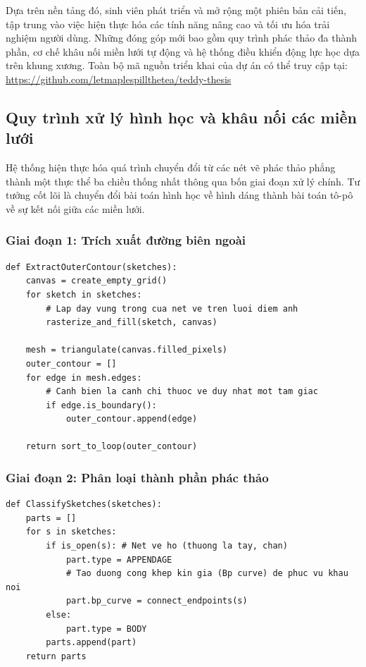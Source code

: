 \documentclass{report}
\newenvironment{graycode}
{\begin{mdframed}[backgroundcolor=light-gray, linecolor=light-gray, roundcorner=5pt]}
{\end{mdframed}}
\begin{document}
Dựa trên nền tảng đó, sinh viên phát triển và mở rộng một phiên bản cải tiến, tập trung vào việc hiện thực hóa các tính năng nâng cao và tối ưu hóa trải nghiệm người dùng. Những đóng góp mới bao gồm quy trình phác thảo đa thành phần, cơ chế khâu nối miền lưới tự động và hệ thống điều khiển động lực học dựa trên khung xương. Toàn bộ mã nguồn triển khai của dự án có thể truy cập tại: \url{https://github.com/letmaplespillthetea/teddy-thesis}

\subsection{Quy trình xử lý hình học và khâu nối các miền lưới}

Hệ thống hiện thực hóa quá trình chuyển đổi từ các nét vẽ phác thảo phẳng thành một thực thể ba chiều thống nhất thông qua bốn giai đoạn xử lý chính. Tư tưởng cốt lõi là chuyển đổi bài toán hình học về hình dáng thành bài toán tô-pô về sự kết nối giữa các miền lưới.

\subsubsection{Giai đoạn 1: Trích xuất đường biên ngoài}
\begin{graycode}
\begin{lstlisting}[caption=Mã giả quy trình trích xuất đường biên]
def ExtractOuterContour(sketches):
    canvas = create_empty_grid()
    for sketch in sketches:
        # Lap day vung trong cua net ve tren luoi diem anh
        rasterize_and_fill(sketch, canvas) 
    
    mesh = triangulate(canvas.filled_pixels)
    outer_contour = []
    for edge in mesh.edges:
        # Canh bien la canh chi thuoc ve duy nhat mot tam giac
        if edge.is_boundary(): 
            outer_contour.append(edge)
            
    return sort_to_loop(outer_contour)
\end{lstlisting}
\end{graycode}

\subsubsection{Giai đoạn 2: Phân loại thành phần phác thảo}
\begin{graycode}
\begin{lstlisting}[caption=Mã giả phân loại bộ phận]
def ClassifySketches(sketches):
    parts = []
    for s in sketches:
        if is_open(s): # Net ve ho (thuong la tay, chan)
            part.type = APPENDAGE
            # Tao duong cong khep kin gia (Bp curve) de phuc vu khau noi
            part.bp_curve = connect_endpoints(s) 
        else:
            part.type = BODY
        parts.append(part)
    return parts
\end{lstlisting}
\end{graycode}
\end{document}
